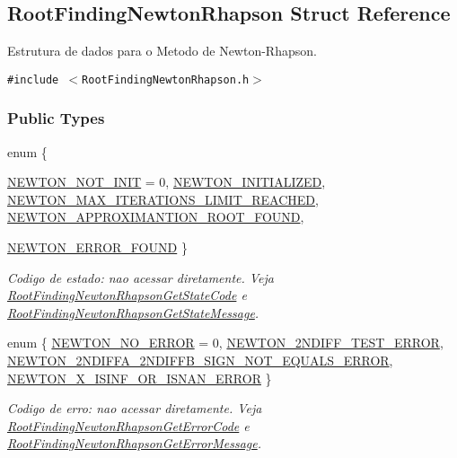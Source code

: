 \hypertarget{structRootFindingNewtonRhapson}{
\subsection{RootFindingNewtonRhapson Struct Reference}
\label{structRootFindingNewtonRhapson}
}
Estrutura de dados para o Metodo de Newton-Rhapson.  


{\tt \#include $<$RootFindingNewtonRhapson.h$>$}

\subsubsection*{Public Types}
\begin{CompactItemize}
\item 
enum \{ \par
\hyperlink{structRootFindingNewtonRhapson_c62450d4b2b4edfb33a87f8666ecc1b10de836829478479dbced05202a2eee31}{NEWTON\_\-NOT\_\-INIT} =  0, 
\hyperlink{structRootFindingNewtonRhapson_c62450d4b2b4edfb33a87f8666ecc1b10f683b02c79234997c808e30017fcf59}{NEWTON\_\-INITIALIZED}, 
\hyperlink{structRootFindingNewtonRhapson_c62450d4b2b4edfb33a87f8666ecc1b1e2aa320e24098ff3148570f453727927}{NEWTON\_\-MAX\_\-ITERATIONS\_\-LIMIT\_\-REACHED}, 
\hyperlink{structRootFindingNewtonRhapson_c62450d4b2b4edfb33a87f8666ecc1b1d252154af3c84f6f77b08ee58704a6c0}{NEWTON\_\-APPROXIMANTION\_\-ROOT\_\-FOUND}, 
\par
\hyperlink{structRootFindingNewtonRhapson_c62450d4b2b4edfb33a87f8666ecc1b101d23e738c77c0e211fc3ef92fb2bda1}{NEWTON\_\-ERROR\_\-FOUND}
 \}
\begin{CompactList}\small\item\em Codigo de estado: nao acessar diretamente. Veja \hyperlink{group____newton_g9d87a4beccc7b61365f6b680fc1a4355}{RootFindingNewtonRhapsonGetStateCode} e \hyperlink{group____newton_g70436f650ac07866bb8d9897908f4422}{RootFindingNewtonRhapsonGetStateMessage}. \item\end{CompactList}\item 
enum \{ \hyperlink{structRootFindingNewtonRhapson_56625414af1ba2259e7d45af1b9130e49e2da2ceb53be3d5c6ff2bc210349fe9}{NEWTON\_\-NO\_\-ERROR} =  0, 
\hyperlink{structRootFindingNewtonRhapson_56625414af1ba2259e7d45af1b9130e494d86b61c05156ca921d680751d1896a}{NEWTON\_\-2NDIFF\_\-TEST\_\-ERROR}, 
\hyperlink{structRootFindingNewtonRhapson_56625414af1ba2259e7d45af1b9130e4494e7dee03b5256e5dce2801e0f1651b}{NEWTON\_\-2NDIFFA\_\-2NDIFFB\_\-SIGN\_\-NOT\_\-EQUALS\_\-ERROR}, 
\hyperlink{structRootFindingNewtonRhapson_56625414af1ba2259e7d45af1b9130e4a4cbeeef7b383bc9331558995a30651c}{NEWTON\_\-X\_\-ISINF\_\-OR\_\-ISNAN\_\-ERROR}
 \}
\begin{CompactList}\small\item\em Codigo de erro: nao acessar diretamente. Veja \hyperlink{group____newton_ga8599365ab3f0770158719cdd32eb5c3}{RootFindingNewtonRhapsonGetErrorCode} e \hyperlink{group____newton_gcbbd94963ebd3ddbaf6bf4e9ce1c0a1f}{RootFindingNewtonRhapsonGetErrorMessage}. \item\end{CompactList}\end{CompactItemize}
